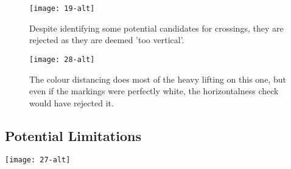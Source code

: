 \documentclass{article}  %
\begin{document}
	\begin{figure}[H]
		\begin{minipage}[c]{0.45\linewidth}
			\centering
			\texttt{[image: 19-alt]}
			\caption{Despite identifying some potential candidates for crossings, they are rejected as they are deemed 'too vertical'.}
		\end{minipage}\hfill
		\begin{minipage}[c]{0.45\linewidth}
		\centering
		\texttt{[image: 28-alt]}
		\caption{The colour distancing does most of the heavy lifting on this one, but even if the markings were perfectly white, the horizontalness check would have rejected it.}
		\end{minipage}
	\end{figure}
	
	\subsection{Potential Limitations}
	
	\texttt{[image: 27-alt]}
	
	
	
\end{document}
